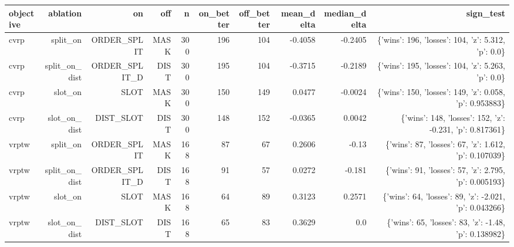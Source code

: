 \begin{tabular}{lrrrrrrrrr}
\toprule
objective & ablation & on & off & n & on\_better & off\_better & mean\_delta & median\_delta & sign\_test \\
\midrule
cvrp & split\_on & ORDER\_SPLIT & MASK & 300 & 196 & 104 & -0.4058 & -0.2405 & \{'wins': 196, 'losses': 104, 'z': 5.312, 'p': 0.0\} \\
cvrp & split\_on\_dist & ORDER\_SPLIT\_D & DIST & 300 & 195 & 104 & -0.3715 & -0.2189 & \{'wins': 195, 'losses': 104, 'z': 5.263, 'p': 0.0\} \\
cvrp & slot\_on & SLOT & MASK & 300 & 150 & 149 & 0.0477 & -0.0024 & \{'wins': 150, 'losses': 149, 'z': 0.058, 'p': 0.953883\} \\
cvrp & slot\_on\_dist & DIST\_SLOT & DIST & 300 & 148 & 152 & -0.0365 & 0.0042 & \{'wins': 148, 'losses': 152, 'z': -0.231, 'p': 0.817361\} \\
vrptw & split\_on & ORDER\_SPLIT & MASK & 168 & 87 & 67 & 0.2606 & -0.13 & \{'wins': 87, 'losses': 67, 'z': 1.612, 'p': 0.107039\} \\
vrptw & split\_on\_dist & ORDER\_SPLIT\_D & DIST & 168 & 91 & 57 & 0.0272 & -0.181 & \{'wins': 91, 'losses': 57, 'z': 2.795, 'p': 0.005193\} \\
vrptw & slot\_on & SLOT & MASK & 168 & 64 & 89 & 0.3123 & 0.2571 & \{'wins': 64, 'losses': 89, 'z': -2.021, 'p': 0.043266\} \\
vrptw & slot\_on\_dist & DIST\_SLOT & DIST & 168 & 65 & 83 & 0.3629 & 0.0 & \{'wins': 65, 'losses': 83, 'z': -1.48, 'p': 0.138982\} \\
\bottomrule
\end{tabular}
